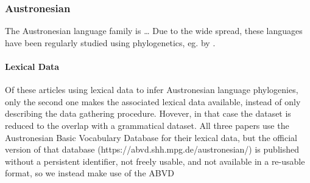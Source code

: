 \documentclass[a4paper,12pt]{scrartcl}
\begin{document}
\subsubsection{Austronesian}

The Austronesian language family is …
Due to the wide spread, these languages have been regularly studied using phylogenetics, eg. by
\textcite{gray2009language,greenhill2017evolutionary,greenhill2018population}.
\paragraph{Lexical Data}
Of these articles using lexical data to infer Austronesian language phylogenies, only the second one
\parencite{greenhill2018population} makes the associated lexical data available, instead of only describing the data gathering procedure.
Hovever, in that case the dataset is reduced to the overlap with a grammatical dataset.
All three papers use the Austronesian Basic Vocabulary Database for their lexical data, but the official version of that database
(https://abvd.shh.mpg.de/austronesian/) is published without a persistent identifier, not freely usable, and not available in a re-usable format, so we instead make use of the ABVD
\end{document}
